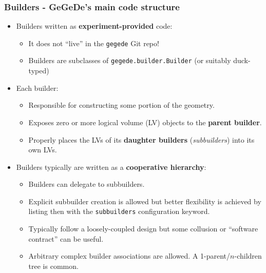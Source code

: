 \documentclass[10pt,xcolor=dvipsnames]{beamer}
\begin{document}
\begin{frame}[fragile]
  \frametitle{Builders - GeGeDe's main code structure}
  \begin{itemize}
  \item Builders written as \textbf{experiment-provided} code:
    \begin{itemize}\footnotesize
    \item It does not ``live'' in the \texttt{gegede} Git repo!
    \item Builders are subclasses of \texttt{gegede.builder.Builder} (or suitably duck-typed)
    \end{itemize}

  \item Each builder:
    \begin{itemize}\footnotesize
    \item Responsible for constructing some portion of the geometry.
    \item Exposes zero or more logical volume (LV) objects to the \textbf{parent builder}.
    \item Properly places the LVs of its \textbf{daughter builders} (\textit{subbuilders}) into its own LVs.
    \end{itemize}
    
  \item Builders typically are written as a \textbf{cooperative hierarchy}:
    \begin{itemize}\footnotesize
    \item Builders can delegate to subbuilders.
    \item Explicit subbuilder creation is allowed but better
      flexibility is achieved by listing then with the
      \texttt{subbuilders} configuration keyword.
    \item Typically follow a loosely-coupled design but
      some collusion or ``software contract'' can be useful.
    \item Arbitrary complex builder associations are allowed.  A
        1-parent/$n$-children tree is common.
    \end{itemize}



  \end{itemize}

\end{frame}
\end{document}

